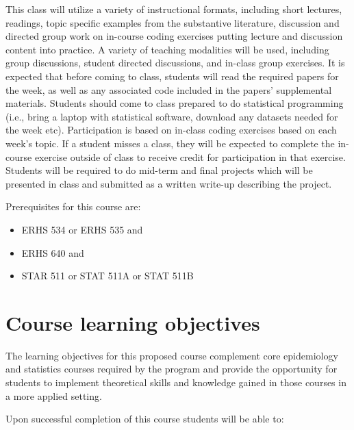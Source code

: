 \documentclass[
]{book}
\providecommand{\tightlist}{%
  \setlength{\itemsep}{0pt}\setlength{\parskip}{0pt}}
\begin{document}
This class will utilize a variety of instructional formats, including short lectures, readings, topic specific examples from the substantive literature, discussion and directed group work on in-course coding exercises putting lecture and discussion content into practice. A variety of teaching modalities will be used, including group discussions, student directed discussions, and in-class group exercises. It is expected that before coming to class, students will read the required papers for the week, as well as any associated code included in the papers' supplemental materials. Students should come to class prepared to do statistical programming (i.e., bring a laptop with statistical software, download any datasets needed for the week etc). Participation is based on in-class coding exercises based on each week's topic. If a student misses a class, they will be expected to complete the in-course exercise outside of class to receive credit for participation in that exercise. Students will be required to do mid-term and final projects which will be presented in class and submitted as a written write-up describing the project.

Prerequisites for this course are:

\begin{itemize}
\tightlist
\item
  ERHS 534 or ERHS 535 and
\item
  ERHS 640 and
\item
  STAR 511 or STAT 511A or STAT 511B
\end{itemize}

\hypertarget{course-learning-objectives}{%
\section{Course learning objectives}\label{course-learning-objectives}}

The learning objectives for this proposed course complement core epidemiology
and statistics courses required by the program and provide the opportunity for
students to implement theoretical skills and knowledge gained in those courses
in a more applied setting.

Upon successful completion of this course students will be able to:
\end{document}
